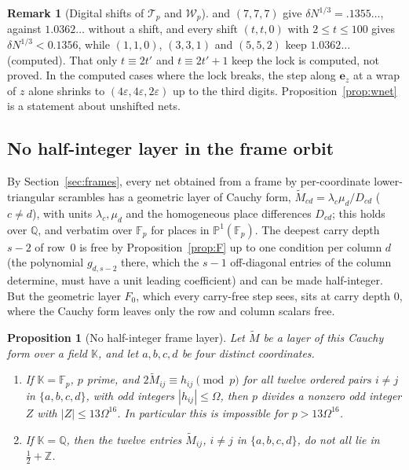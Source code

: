 \documentclass[11pt]{amsart}
\newtheorem{proposition}[theorem]{Proposition}
\theoremstyle{definition}
\newtheorem{remark}[theorem]{Remark}
\theoremstyle{plain}
\newcommand{\Z}{\mathbb{Z}}
\newcommand{\F}{\mathbb{F}}
\newcommand{\e}{\mathbf{e}}
\begin{document}
\begin{remark}[Digital shifts of $\mathcal T_p$ and $\mathcal W_p$]
and $(7,7,7)$ give $\delta N^{1/3}=.1355\ldots$, against $1.0362\ldots$ without a shift, and every shift $(t,t,0)$ with $2\le t\le100$ gives $\delta N^{1/3}<0.1356$, while $(1,1,0)$, $(3,3,1)$ and $(5,5,2)$ keep $1.0362\ldots$ (computed). That only $t\equiv2t'$ and $t\equiv2t'+1$ keep the lock is computed, not proved. In the computed cases where the lock breaks, the step along $\e_z$ at a wrap of $z$ alone shrinks to $(4\varepsilon,4\varepsilon,2\varepsilon)$ up to the third digits. Proposition~\ref{prop:wnet} is a statement about unshifted nets.
\end{remark}

\subsection{No half-integer layer in the frame orbit}\label{sec:Pnohalf}
By Section~\ref{sec:frames}, every net obtained from a frame by per-coordinate lower-triangular scrambles has a geometric layer of Cauchy form, $\tilde M_{cd}=\lambda_c\mu_d/D_{cd}$ ($c\ne d$), with units $\lambda_c,\mu_d$ and the homogeneous place differences $D_{cd}$; this holds over $\mathbb{Q}$, and verbatim over $\F_p$ for places in $\mathbb P^1(\F_p)$. The deepest carry depth $s-2$ of row~$0$ is free by Proposition~\ref{prop:F} up to one condition per column $d$ (the polynomial $g_{d,s-2}$ there, which the $s-1$ off-diagonal entries of the column determine, must have a unit leading coefficient) and can be made half-integer. But the geometric layer $F_0$, which every carry-free step sees, sits at carry depth $0$, where the Cauchy form leaves only the row and column scalars free.

\begin{proposition}[No half-integer frame layer]\label{prop:P}
Let $\tilde M$ be a layer of this Cauchy form over a field $\mathbb K$, and let $a,b,c,d$ be four distinct coordinates.
\begin{enumerate}
\item If $\mathbb K=\F_p$, $p$ prime, and $2\tilde M_{ij}\equiv h_{ij}\pmod p$ for all twelve ordered pairs $i\ne j$ in $\{a,b,c,d\}$, with odd integers $|h_{ij}|\le\Omega$, then $p$ divides a nonzero odd integer $Z$ with $|Z|\le13\Omega^{16}$. In particular this is impossible for $p>13\Omega^{16}$.
\item If $\mathbb K=\mathbb{Q}$, then the twelve entries $\tilde M_{ij}$, $i\ne j$ in $\{a,b,c,d\}$, do not all lie in $\frac12+\Z$.
\end{enumerate}
\end{proposition}
\end{document}
